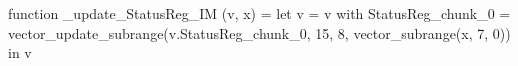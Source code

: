 function _update_StatusReg_IM (v, x) = let v = { v with StatusReg_chunk_0 = vector_update_subrange(v.StatusReg_chunk_0, 15, 8, vector_subrange(x, 7, 0)) } in v
